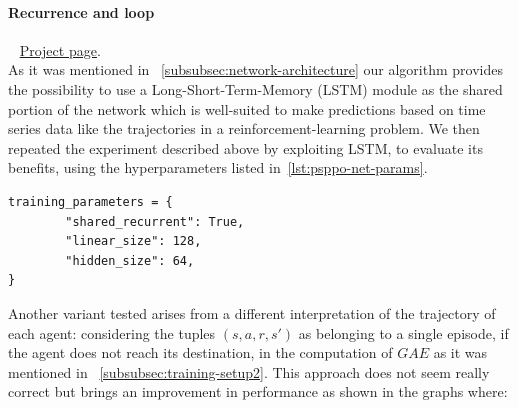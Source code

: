 \documentclass[11pt, a4paper, hidelinks]{report}
\begin{document}
\paragraph{Recurrence and loop}\label{par:psppo_recurrence_loop}
~\newline
\href{https://wandb.ai/fiorenzoparascandolo/flatland-challenge-ps-ppo-test}{Project page}.\\

As it was mentioned in ~\ref{subsubsec:network-architecture} our algorithm provides the possibility to use a Long-Short-Term-Memory (LSTM) module as the shared portion of the network which is well-suited to make predictions based on time series data like the trajectories in a reinforcement-learning problem.
We then repeated the experiment described above by exploiting LSTM, to evaluate its benefits, using the hyperparameters listed in~\ref{lst:psppo-net-params}.
\begin{lstlisting}[label={lst:psppo-net-params}]
training_parameters = {
        "shared_recurrent": True,
        "linear_size": 128,
        "hidden_size": 64,
}
\end{lstlisting}
Another variant tested arises from a different interpretation of the trajectory of each agent: considering the tuples $(s, a, r, s')$ as belonging to a single episode, if the agent does not reach its destination, in the computation of $GAE$ as it was mentioned in ~\ref{subsubsec:training-setup2}.
This approach does not seem really correct but brings an improvement in performance as shown in the graphs where:
\end{document}
